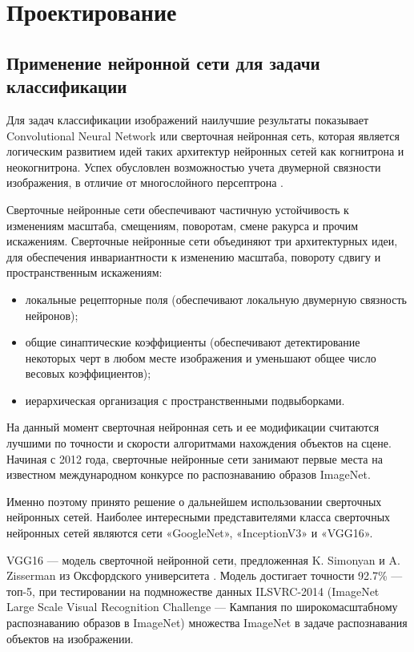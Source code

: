 \section{Проектирование}
\subsection{Применение нейронной сети для задачи классификации}

Для задач классификации изображений наилучшие результаты показывает Convolutional Neural Network или сверточная нейронная сеть, которая является логическим развитием идей таких архитектур нейронных сетей как когнитрона и неокогнитрона. 
Успех обусловлен возможностью учета двумерной связности изображения, в отличие от многослойного персептрона \cite{conv-neoro}. 

Сверточные нейронные сети обеспечивают частичную устойчивость к изменениям масштаба, смещениям, поворотам, смене ракурса и прочим искажениям. 
Сверточные нейронные сети объединяют три архитектурных идеи, для обеспечения инвариантности к изменению масштаба, повороту сдвигу и пространственным искажениям:
\begin{itemize}
    \item локальные рецепторные поля (обеспечивают локальную двумерную связность нейронов);
    \item общие синаптические коэффициенты (обеспечивают детектирование некоторых черт в любом месте изображения и уменьшают общее число весовых коэффициентов);
    \item иерархическая организация с пространственными подвыборками.
\end{itemize}

На данный момент сверточная нейронная сеть и ее модификации считаются лучшими по точности и скорости алгоритмами нахождения объектов на сцене. 
Начиная с 2012 года, сверточные нейронные сети занимают первые места на известном международном конкурсе по распознаванию образов ImageNet.

Именно поэтому принято решение о дальнейшем использовании сверточных нейронных сетей. 
Наиболее интересными представителями класса сверточных нейронных сетей являются сети «GoogleNet», «InceptionV3» и «VGG16».

VGG16 — модель сверточной нейронной сети, предложенная K. Simonyan и A. Zisserman из Оксфордского университета \cite{vgg16alg}. 
Модель достигает точности 92.7\% — топ-5, при тестировании на подмножестве данных ILSVRC-2014 (ImageNet Large Scale Visual Recognition Challenge — Кампания по широкомасштабному распознаванию образов в ImageNet) множества ImageNet в задаче распознавания объектов на изображении. 

